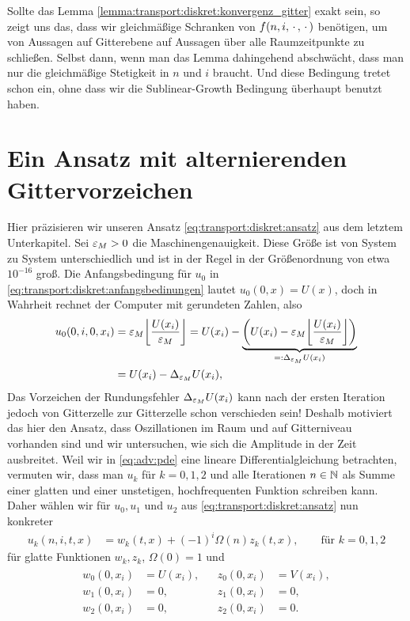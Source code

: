 Sollte das Lemma \ref{lemma:transport:diskret:konvergenz_gitter} exakt sein, so zeigt uns das, dass wir gleichmäßige Schranken von $f(n, i, \, \cdot \,, \, \cdot \,)$ benötigen, um von Aussagen auf Gitterebene auf Aussagen über alle Raumzeitpunkte zu schließen.
Selbst dann, wenn man das Lemma dahingehend abschwächt, dass man nur die gleichmäßige Stetigkeit in $n$ und $i$ braucht.
Und diese Bedingung tretet schon ein, ohne dass wir die Sublinear-Growth Bedingung überhaupt benutzt haben.


\section {Ein Ansatz mit alternierenden Gittervorzeichen}\label{sec:transport:osz}

Hier präzisieren wir unseren Ansatz \eqref{eq:transport:diskret:ansatz} aus dem letztem Unterkapitel. %
Sei $\varepsilon_M > 0$ die Maschinengenauigkeit.
Diese Größe ist von System zu System unterschiedlich und ist in der Regel in der Größenordnung von etwa $10^{-16}$ groß.
Die Anfangsbedingung für $u_0$ in \eqref{eq:transport:diskret:anfangsbedinungen} lautet $u_0(0, x) = U(x)$, doch in Wahrheit rechnet der Computer mit gerundeten Zahlen, also
\begin{align*}
u_0(0, i, 0, x_i) &= \rd{U(x_i)} = U(x_i) - \underbrace{\left( U(x_i) - \rd{U(x_i)} \right)}_{=: \Delta_{\eps_M} U(x_i)}\\
&= U(x_i) - \Delta_{\eps_M} U(x_i),
\end{align*}
Das Vorzeichen der Rundungsfehler $\Delta_{\varepsilon_M} U(x_i)$ kann nach der ersten Iteration jedoch von Gitterzelle zur Gitterzelle schon verschieden sein!
Deshalb motiviert das hier den Ansatz, dass Oszillationen im Raum und auf Gitterniveau vorhanden sind und wir untersuchen, wie sich die Amplitude in der Zeit ausbreitet.
Weil wir in \eqref{eq:adv:pde} eine lineare Differentialgleichung betrachten, vermuten wir, dass man $u_k$ für $k = 0,1,2$ und alle Iterationen $n \in \mathbb N$ als Summe einer glatten und einer unstetigen, hochfrequenten Funktion schreiben kann.
Daher wählen wir für $u_0, u_1$ und $u_2$ aus \eqref{eq:transport:diskret:ansatz} nun konkreter 
\begin{align}\label{eq:transport:osz:ansatz1}
u_k(n, i, t, x) &= w_k(t, x) + (-1)^i \Omega(n) z_k(t, x), \qquad \text{für $k = 0,1,2$}
\end{align}
für glatte Funktionen $w_k, z_k$, $\Omega(0) = 1$ und
\begin{align}\label{eq:transport:osz:anfangsbedinungen}
\begin{split}
w_0(0, x_i) &= U(x_i),\\
w_1(0, x_i) &= 0,\\
w_2(0, x_i) &= 0,
\end{split}&
\begin{split}
z_0(0, x_i) &= V(x_i),\\
z_1(0, x_i) &= 0,\\
z_2(0, x_i) &= 0.
\end{split}
\end{align}
